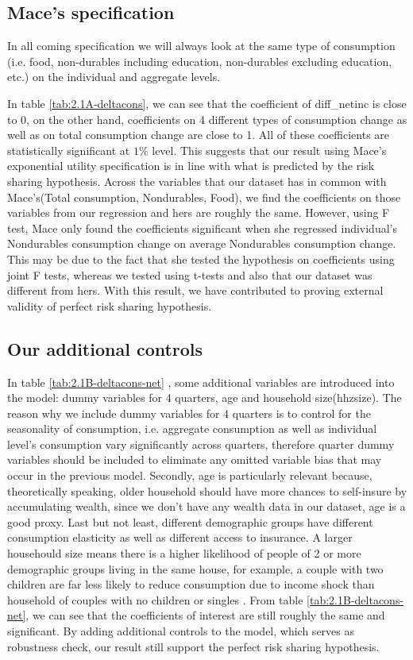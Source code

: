 \documentclass[12pt,a4paper]{article}
\begin{document}
\subsection{Mace's specification}
In all coming specification we will always look at the same type of consumption (i.e. food, non-durables including education, non-durables excluding education, etc.) on the individual and aggregate levels. 




In table \ref{tab:2.1A-deltacons}, we can see that the coefficient of diff\_netinc is close to 0, on the other hand, coefficients on 4 different types of consumption change as well as on total consumption change are close to 1. All of these coefficients are statistically significant at $1\%$ level. This suggests that our result using Mace's exponential utility specification is in line with what is predicted by the risk sharing hypothesis. Across the variables that our dataset has in common with Mace's(Total consumption, Nondurables, Food), we find the coefficients on those variables from our regression and hers are roughly the same. However, using F test, Mace only found the coefficients significant when she regressed individual's Nondurables consumption change on average Nondurables consumption change. This may be due to the fact that she tested the hypothesis on coefficients using joint F tests, whereas we tested using t-tests and also that our dataset was different from hers. With this result, we have contributed to proving external validity of perfect risk sharing hypothesis.

\subsection{Our additional controls} 

In table \ref{tab:2.1B-deltacons-net} , some additional variables are introduced into the model: dummy variables for 4 quarters, age and household size(hhzsize). The reason why we include dummy variables for 4 quarters is to control for the seasonality of consumption, i.e. aggregate consumption as well as individual level's consumption vary significantly across quarters, therefore quarter dummy variables should be included to eliminate any omitted variable bias that may occur in the previous model. Secondly, age is particularly relevant because, theoretically speaking, older household should have more chances to self-insure by accumulating wealth, since we don't have any wealth data in our dataset, age is a good proxy. Last but not least, different demographic groups have different consumption elasticity as well as different access to insurance. A larger househould size means there is a higher likelihood of people of 2 or more demographic groups living in the same house, for example, a couple with two children are far less likely to reduce consumption due to income shock than household of couples with no children or singles  
. From table \ref{tab:2.1B-deltacons-net}, we can see that the coefficients of interest are still roughly the same and significant. By adding additional controls to the model, which serves as robustness check, our result still support the perfect risk sharing hypothesis.  
\end{document}
